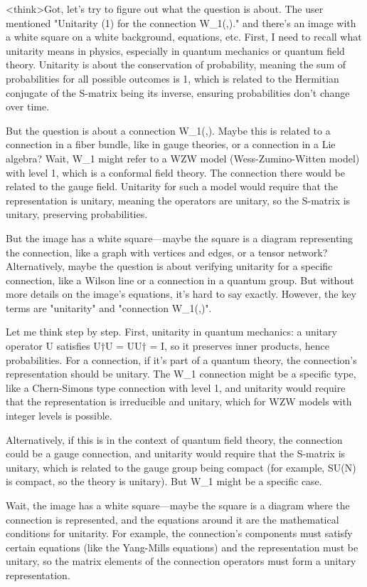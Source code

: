 <think>Got, let's try to figure out what the question is about. The user mentioned "Unitarity (1) for the connection W_1(,)." and there's an image with a white square on a white background, equations, etc. First, I need to recall what unitarity means in physics, especially in quantum mechanics or quantum field theory. Unitarity is about the conservation of probability, meaning the sum of probabilities for all possible outcomes is 1, which is related to the Hermitian conjugate of the S-matrix being its inverse, ensuring probabilities don't change over time.

But the question is about a connection W_1(,). Maybe this is related to a connection in a fiber bundle, like in gauge theories, or a connection in a Lie algebra? Wait, W_1 might refer to a WZW model (Wess-Zumino-Witten model) with level 1, which is a conformal field theory. The connection there would be related to the gauge field. Unitarity for such a model would require that the representation is unitary, meaning the operators are unitary, so the S-matrix is unitary, preserving probabilities.

But the image has a white square—maybe the square is a diagram representing the connection, like a graph with vertices and edges, or a tensor network? Alternatively, maybe the question is about verifying unitarity for a specific connection, like a Wilson line or a connection in a quantum group. But without more details on the image's equations, it's hard to say exactly. However, the key terms are "unitarity" and "connection W_1(,)".

Let me think step by step. First, unitarity in quantum mechanics: a unitary operator U satisfies U†U = UU† = I, so it preserves inner products, hence probabilities. For a connection, if it's part of a quantum theory, the connection's representation should be unitary. The W_1 connection might be a specific type, like a Chern-Simons type connection with level 1, and unitarity would require that the representation is irreducible and unitary, which for WZW models with integer levels is possible.

Alternatively, if this is in the context of quantum field theory, the connection could be a gauge connection, and unitarity would require that the S-matrix is unitary, which is related to the gauge group being compact (for example, SU(N) is compact, so the theory is unitary). But W_1 might be a specific case.

Wait, the image has a white square—maybe the square is a diagram where the connection is represented, and the equations around it are the mathematical conditions for unitarity. For example, the connection's components must satisfy certain equations (like the Yang-Mills equations) and the representation must be unitary, so the matrix elements of the connection operators must form a unitary representation.

